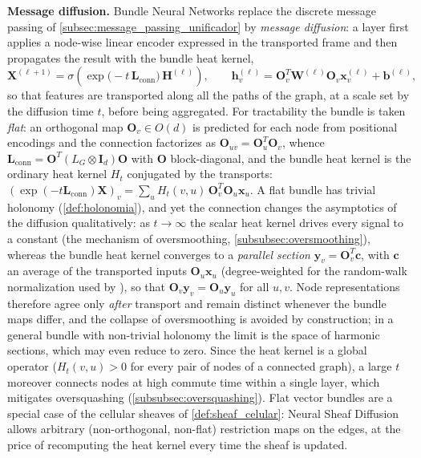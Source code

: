 \begin{example}
\textbf{Message diffusion.} Bundle Neural Networks \citep{bamberger2024bundlenn} replace the discrete message passing of \autoref{subsec:message_passing_unificador} by \textit{message diffusion}: a layer first applies a node-wise linear encoder expressed in the transported frame and then propagates the result with the bundle heat kernel,
\begin{equation}
\mathbf{X}^{(\ell+1)} = \sigma\!\left(\exp\bigl(-t\,\mathbf{L}_{\mathrm{conn}}\bigr)\, \mathbf{H}^{(\ell)}\right), \qquad \mathbf{h}^{(\ell)}_v = \mathbf{O}_v^T \mathbf{W}^{(\ell)} \mathbf{O}_v \mathbf{x}^{(\ell)}_v + \mathbf{b}^{(\ell)},
\end{equation}
so that features are transported along all the paths of the graph, at a scale set by the diffusion time $t$, before being aggregated. For tractability the bundle is taken \textit{flat}: an orthogonal map $\mathbf{O}_v \in O(d)$ is predicted for each node from positional encodings and the connection factorizes as $\mathbf{O}_{uv} = \mathbf{O}_u^T \mathbf{O}_v$, whence $\mathbf{L}_{\mathrm{conn}} = \mathbf{O}^T(L_G \otimes \mathbf{I}_d)\mathbf{O}$ with $\mathbf{O}$ block-diagonal, and the bundle heat kernel is the ordinary heat kernel $H_t$ conjugated by the transports: $(\exp(-t\mathbf{L}_{\mathrm{conn}})\mathbf{X})_v = \sum_u H_t(v,u)\,\mathbf{O}_v^T\mathbf{O}_u\mathbf{x}_u$. A flat bundle has trivial holonomy (\autoref{def:holonomia}), and yet the connection changes the asymptotics of the diffusion qualitatively: as $t \to \infty$ the scalar heat kernel drives every signal to a constant (the mechanism of \gls{oversmoothing}, \autoref{subsubsec:oversmoothing}), whereas the bundle heat kernel converges to a \textit{parallel section} $\mathbf{y}_v = \mathbf{O}_v^T \mathbf{c}$, with $\mathbf{c}$ an average of the transported inputs $\mathbf{O}_u \mathbf{x}_u$ (degree-weighted for the random-walk normalization used by \citet{bamberger2024bundlenn}), so that $\mathbf{O}_v \mathbf{y}_v = \mathbf{O}_u \mathbf{y}_u$ for all $u, v$. Node representations therefore agree only \textit{after} transport and remain distinct whenever the bundle maps differ, and the collapse of \gls{oversmoothing} is avoided by construction; in a general bundle with non-trivial holonomy the limit is the space of harmonic sections, which may even reduce to zero. Since the heat kernel is a global operator ($H_t(v,u) > 0$ for every pair of nodes of a connected graph), a large $t$ moreover connects nodes at high commute time within a single layer, which mitigates \gls{oversquashing} (\autoref{subsubsec:oversquashing}). Flat vector bundles are a special case of the cellular sheaves of \autoref{def:sheaf_celular}: Neural Sheaf Diffusion \citep{bodnar2022neural} allows arbitrary (non-orthogonal, non-flat) restriction maps on the edges, at the price of recomputing the heat kernel every time the sheaf is updated.
\end{example}

